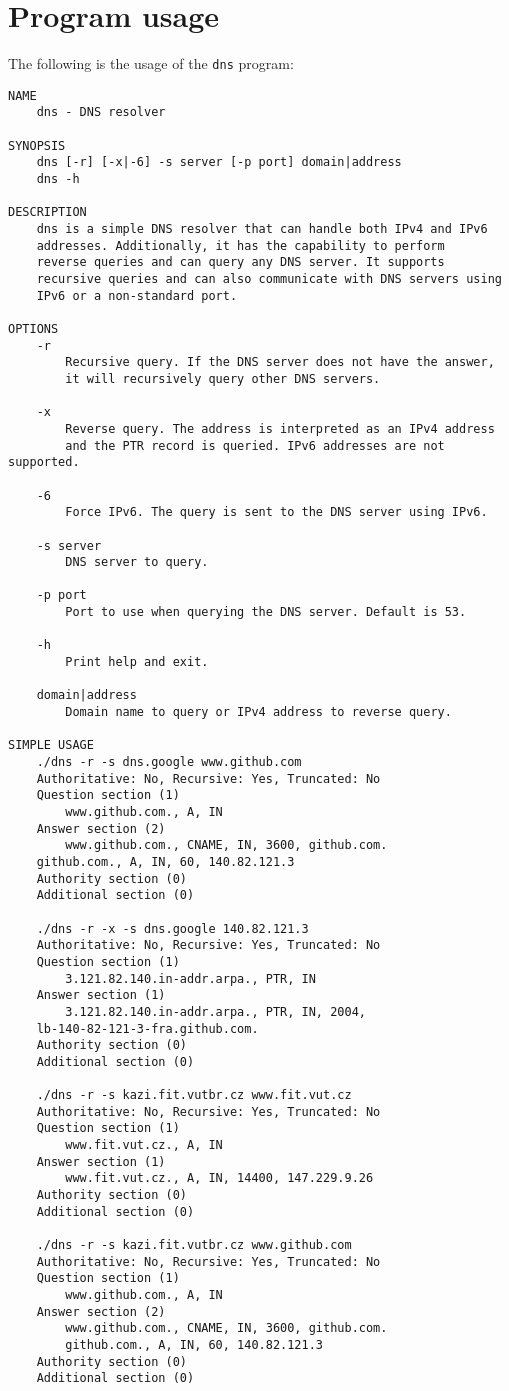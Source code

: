 \documentclass[a4paper, 11pt]{article}
\begin{document}
\section{Program usage}

    The following is the usage of the \texttt{dns} program:
    \begin{verbatim}
NAME
    dns - DNS resolver

SYNOPSIS
    dns [-r] [-x|-6] -s server [-p port] domain|address
    dns -h

DESCRIPTION
    dns is a simple DNS resolver that can handle both IPv4 and IPv6 
    addresses. Additionally, it has the capability to perform 
    reverse queries and can query any DNS server. It supports 
    recursive queries and can also communicate with DNS servers using 
    IPv6 or a non-standard port. 

OPTIONS
    -r
        Recursive query. If the DNS server does not have the answer, 
        it will recursively query other DNS servers.
    
    -x
        Reverse query. The address is interpreted as an IPv4 address
        and the PTR record is queried. IPv6 addresses are not supported.
    
    -6
        Force IPv6. The query is sent to the DNS server using IPv6.

    -s server
        DNS server to query.
    
    -p port
        Port to use when querying the DNS server. Default is 53.

    -h
        Print help and exit.
    
    domain|address
        Domain name to query or IPv4 address to reverse query.

SIMPLE USAGE
    ./dns -r -s dns.google www.github.com
    Authoritative: No, Recursive: Yes, Truncated: No    
    Question section (1)
        www.github.com., A, IN
    Answer section (2)
        www.github.com., CNAME, IN, 3600, github.com.
    github.com., A, IN, 60, 140.82.121.3
    Authority section (0)
    Additional section (0)

    ./dns -r -x -s dns.google 140.82.121.3
    Authoritative: No, Recursive: Yes, Truncated: No    
    Question section (1)
        3.121.82.140.in-addr.arpa., PTR, IN
    Answer section (1)
        3.121.82.140.in-addr.arpa., PTR, IN, 2004, 
    lb-140-82-121-3-fra.github.com.
    Authority section (0)
    Additional section (0)  

    ./dns -r -s kazi.fit.vutbr.cz www.fit.vut.cz
    Authoritative: No, Recursive: Yes, Truncated: No
    Question section (1)
        www.fit.vut.cz., A, IN
    Answer section (1)
        www.fit.vut.cz., A, IN, 14400, 147.229.9.26
    Authority section (0)
    Additional section (0)

    ./dns -r -s kazi.fit.vutbr.cz www.github.com
    Authoritative: No, Recursive: Yes, Truncated: No
    Question section (1)
        www.github.com., A, IN
    Answer section (2)
        www.github.com., CNAME, IN, 3600, github.com.
        github.com., A, IN, 60, 140.82.121.3
    Authority section (0)
    Additional section (0)
    \end{verbatim}
\end{document}

